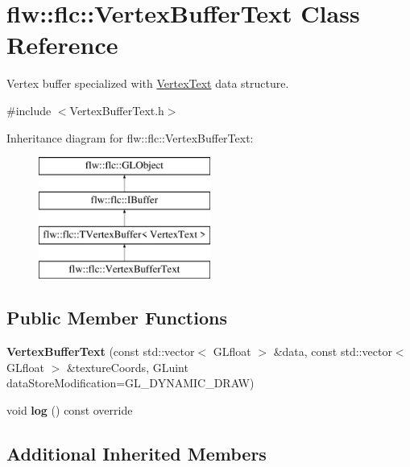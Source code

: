 \hypertarget{classflw_1_1flc_1_1VertexBufferText}{}\section{flw\+:\+:flc\+:\+:Vertex\+Buffer\+Text Class Reference}
\label{classflw_1_1flc_1_1VertexBufferText}


Vertex buffer specialized with \hyperlink{structflw_1_1flc_1_1VertexText}{Vertex\+Text} data structure.  




{\ttfamily \#include $<$Vertex\+Buffer\+Text.\+h$>$}

Inheritance diagram for flw\+:\+:flc\+:\+:Vertex\+Buffer\+Text\+:\begin{figure}[H]
\begin{center}
\leavevmode
\includegraphics[height=4.000000cm]{classflw_1_1flc_1_1VertexBufferText}
\end{center}
\end{figure}
\subsection*{Public Member Functions}
\begin{DoxyCompactItemize}
\item 
\mbox{\label{classflw_1_1flc_1_1VertexBufferText_a4d274aa17e9c891423933feea5b02bc2}} 
{\bfseries Vertex\+Buffer\+Text} (const std\+::vector$<$ G\+Lfloat $>$ \&data, const std\+::vector$<$ G\+Lfloat $>$ \&texture\+Coords, G\+Luint data\+Store\+Modification=G\+L\+\_\+\+D\+Y\+N\+A\+M\+I\+C\+\_\+\+D\+R\+AW)
\item 
\mbox{\label{classflw_1_1flc_1_1VertexBufferText_afd6bb4981dd84c85cc39946fff41b3e4}} 
void {\bfseries log} () const override
\end{DoxyCompactItemize}
\subsection*{Additional Inherited Members}


